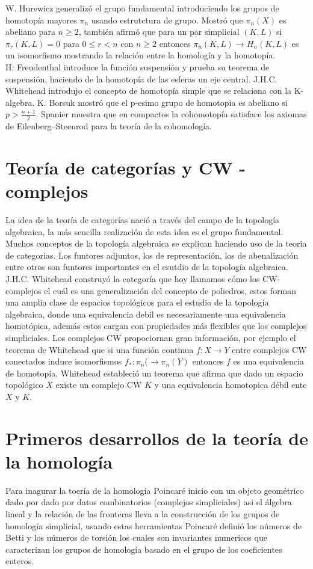 \documentclass[12pt,letterpaper]{article}
\begin{document}
W. Hurewicz generalizó el grupo fundamental introduciendo los grupos de homotopía mayores $\pi_n$ usando estrutctura de grupo. Mostró que $\pi_n(X)$ es abeliano para $n\geq 2$, también afirmó que para un par simplicial $(K,L)$ si $\pi_r(K,L)=0$ para $0\leq r<n$ con $n\geq 2$ entonces $\pi_n(K,L)\rightarrow H_n(K,L)$ es un isomorfismo mostrando la relación entre la homología y la homotopía. \\

H. Freudenthal introduce la función suspensión y prueba su teorema de suspensión, haciendo de la homotopía de las esferas un eje central. J.H.C. Whitehead introdujo el concepto de homotopía simple que se relaciona con la K-algebra. K. Borsuk mostró que el p-esimo grupo de homotopia es abeliano si $p>\frac{n+1}{2}$. Spanier muestra que en compactos la cohomotopía satisface los axiomas de Eilenberg–Steenrod para la teoría de la cohomología. 

\section*{Teoría de categorías y CW - complejos}
La idea de la teoría de categorías nació a través del campo de la topología algebraica, la más sencilla realización de esta idea es el grupo fundamental. Muchos conceptos de la topología algebraica se explican haciendo uso de la teoria de categorias. Los funtores adjuntos, los de representación, los de abenalización entre otros son funtores importantes en el esutdio de la topología algebraica. \\

J.H.C. Whitehead construyó la categoría que hoy llamamos cómo los CW-complejos el cuál es una generalización del concepto de poliedros, estos forman una amplia clase de espacios topológicos para el estudio de la topología algebraica, donde una equivalencia debil es necesariamente una equivalencia homotópica, además estos cargan con propiedades más flexibles que los complejos simpliciales. Los complejos CW propociornan gran información, por ejemplo el teorema de Whitehead que si una función continua $f:X\rightarrow Y$ entre complejos CW conectados induce isomorfismos $f_*:\pi_n(\rightarrow \pi_n(Y)$ entonces $f$ es una equivalencia de homotopía. Whitehead estableció un teorema que afirma que dado un espacio topológico $X$ existe un complejo CW $K$ y una equivalencia homotopica débil ente $X$ y $K$.

\section*{Primeros desarrollos de la teoría de la homología}
Para inagurar la toería de la homología Poincaré inicio con un objeto geométrico dado por dado por datos combinatorios (complejos simpliciales) asi el álgebra lineal y la relación de las fronteras lleva a la construcción de los grupos de homología simplicial, usando estas herramientas Poincaré definió los números de Betti y los números de torsión los cuales son invariantes numericos que caracterizan los grupos de homología basado en el grupo de los coeficientes enteros. \\
\end{document}
